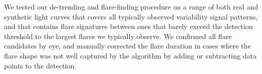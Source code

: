 \documentclass[fleqn,usenatbib,letters]{mnras}%
\begin{document}
We tested our de-trending and flare-finding procedure on a range of both real and synthetic light curves that covers all typically observed variability signal patterns, and that contains flare signatures between ones that barely exceed the detection threshold to the largest flares we typically observe. We confirmed all flare candidates by eye, and manually corrected the flare duration in cases where the flare shape was not well captured by the algorithm by adding or subtracting data points to the detection. 


\end{document}

